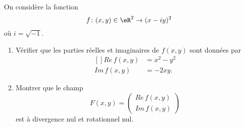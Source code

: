 
\begin{exercice}\label{exoOutilsMath-0125}

    On considère la fonction
    \begin{equation}
        f\colon (x,y)\in\eR^2\to (x-iy)^2
    \end{equation}
    où \( i=\sqrt{-1}\).
    \begin{enumerate}
        \item
            Vérifier que les parties réelles et imaginaires de \( f(x,y)\) sont données par
            \begin{equation}
                \begin{aligned}[]
                    Re\, f(x,y)&=x^2-y^2\\
                    Im\, f(x,y)&=-2xy.
                \end{aligned}
            \end{equation}
        \item
            Montrer que le champ
            \begin{equation}
                F(x,y)=\begin{pmatrix}
                    Re\,f(x,y)    \\ 
                    Im\, f(x,y)    
                \end{pmatrix}
            \end{equation}
            est à divergence nul et rotationnel nul.
    \end{enumerate}

\end{exercice}

